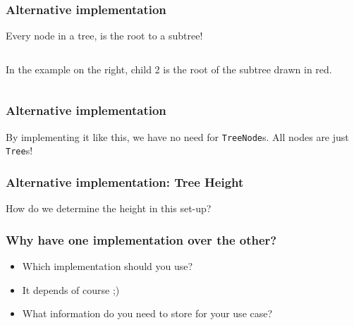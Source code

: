 \begin{frame}
	\frametitle{Alternative implementation}
			Every node in a tree, is the root to a subtree!
		
		\begin{columns}[T]
				
			

					In the example on the right, child 2 is the root of the subtree drawn in red.
		\end{columns}
\end{frame}


\begin{frame}
	\frametitle{Alternative implementation}
By implementing it like this, we have no need for \texttt{TreeNode}s. All nodes are just \texttt{Tree}s!

		
\end{frame}

\begin{frame}
	\frametitle{Alternative implementation: Tree Height}
How do we determine the height in this set-up?
	
	
\end{frame}

\begin{frame}
	\frametitle{Why have one implementation over the other?}

				\begin{itemize}
				\item Which implementation should you use?
					\item	It depends of course ;)
						\item What information do you need to store for your use case?
	\end{itemize}
	
\end{frame}

